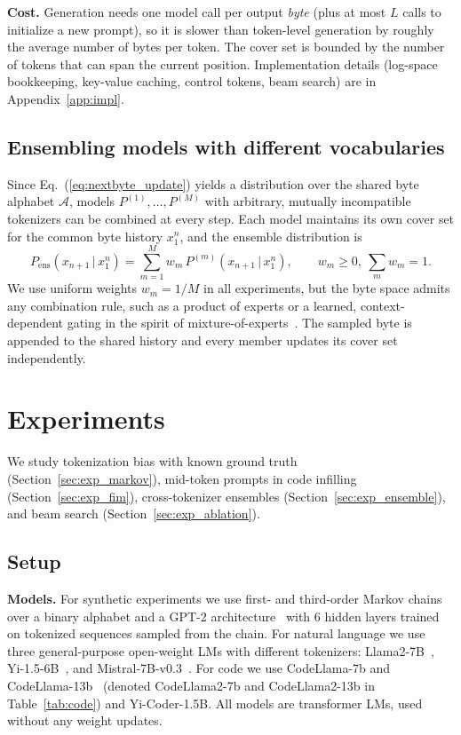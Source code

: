 \documentclass{article} %
\newcommand{\Abet}{\mathcal{A}}
\begin{document}
\textbf{Cost.} Generation needs one model call per output \emph{byte} (plus at most $L$ calls to initialize a new prompt), so it is slower than token-level generation by roughly the average number of bytes per token. The cover set is bounded by the number of tokens that can span the current position. Implementation details (log-space bookkeeping, key-value caching, control tokens, beam search) are in Appendix~\ref{app:impl}.

\subsection{Ensembling models with different vocabularies}
\label{sec:method_ensemble}
Since Eq.~(\ref{eq:nextbyte_update}) yields a distribution over the shared byte alphabet $\Abet$, models $P^{(1)},\ldots,P^{(M)}$ with arbitrary, mutually incompatible tokenizers can be combined at every step. Each model maintains its own cover set for the common byte history $x_1^n$, and the ensemble distribution is
\begin{equation}
P_{\mathrm{ens}}(x_{n+1}\,|\,x_1^n) = \sum_{m=1}^{M} w_m\, P^{(m)}(x_{n+1}\,|\,x_1^n), \qquad w_m\ge 0,\ \textstyle\sum_m w_m = 1. \label{eq:ensemble}
\end{equation}
We use uniform weights $w_m=1/M$ in all experiments, but the byte space admits any combination rule, such as a product of experts or a learned, context-dependent gating in the spirit of mixture-of-experts~\citep{shazeer2017moe}. The sampled byte is appended to the shared history and every member updates its cover set independently.

\section{Experiments}
\label{sec:experiments}
We study tokenization bias with known ground truth (Section~\ref{sec:exp_markov}), mid-token prompts in code infilling (Section~\ref{sec:exp_fim}), cross-tokenizer ensembles (Section~\ref{sec:exp_ensemble}), and beam search (Section~\ref{sec:exp_ablation}).

\subsection{Setup}
\label{sec:exp_setup}
\textbf{Models.} For synthetic experiments we use first- and third-order Markov chains over a binary alphabet and a GPT-2 architecture~\citep{radford2019gpt2} with 6 hidden layers trained on tokenized sequences sampled from the chain. For natural language we use three general-purpose open-weight LMs with different tokenizers: Llama2-7B~\citep{touvron2023llama2}, Yi-1.5-6B~\citep{young2024yi}, and Mistral-7B-v0.3~\citep{jiang2023mistral}. For code we use CodeLlama-7b and CodeLlama-13b~\citep{roziere2023codellama} (denoted CodeLlama2-7b and CodeLlama2-13b in Table~\ref{tab:code}) and Yi-Coder-1.5B. All models are transformer LMs, used without any weight updates.
\end{document}
